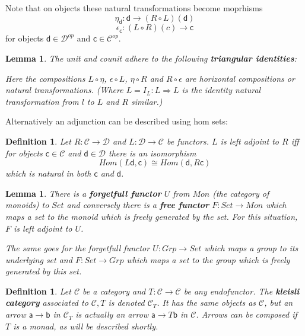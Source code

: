 \documentclass{article}
\newcommand{\cat}[1]{\mathcal{#1}} %
\newcommand{\ob}[1]{\mathsf{#1}} %
\newcommand{\catop}[1]{\cat{#1}^{op}}
\newtheorem{lemma}[theorem]{Lemma}
\newtheorem{definition}[theorem]{Definition}
\begin{document}
Note that on objects these natural transformations become moprhisms
$$\eta_\ob{d}: \ob{d} \rightarrow (R \circ L)(\ob{d})$$
$$\epsilon_\ob{c}: (L \circ R)(c) \rightarrow \ob{c}$$
for objects $\ob{d} \in \catop{D}$ and $\ob{c} \in \catop{C}$.

\begin{lemma}
	The unit and counit adhere to the following \textbf{triangular identities}:
	Here the compositions $L \circ \eta$, $\epsilon \circ L$, $\eta \circ R$ and $R \circ \epsilon$ are horizontal compositions or natural transformations.
	(Where $L = I_L: L \Rightarrow L$ is the identity natural transformation from $l$ to $L$ and $R$ similar.)
\end{lemma}

Alternatively an adjunction can be described using hom sets:

\begin{definition}
	Let $R: \cat{C} \rightarrow \cat{D}$ and $L: \cat{D} \rightarrow \cat{C}$ be functors. $L$ is left adjoint to $R$ iff for objects $\ob{c} \in \cat{C}$
	and $\ob{d} \in \cat{D}$ there is an isomorphism $$ Hom(L\ob{d}, \ob{c}) \cong Hom(\ob{d}, R\ob{c})$$
	which is natural in both $\ob{c}$ and $\ob{d}$.
\end{definition}

\begin{lemma}
	There is a \textbf{forgetfull functor} $U$ from $Mon$ (the category of monoids) to $Set$ and conversely there is a \textbf{free functor}
	$F: Set \rightarrow Mon$ which maps a set to the monoid which is freely generated by the set.
	For this situation, $F$ is left adjoint to $U$.

	The same goes for the forgetfull functor $U: Grp \rightarrow Set$ which maps a group to its underlying set and $F: Set \rightarrow Grp$ which maps a set to the group which is freely generated by this set.
\end{lemma}

\begin{definition}
	Let $\cat{C}$ be a category and $T: \cat{C} \rightarrow \cat{C}$ be any endofunctor.
	The \textbf{kleisli category} associated to $\cat{C}, T$ is denoted $\cat{C}_T$.
	It has the same objects as $\cat{C}$, but an arrow $\ob{a} \rightarrow \ob{b}$ in $\cat{C}_T$ is actually an arrow $\ob{a} \rightarrow T\ob{b}$ in $\cat{C}$.
	Arrows can be composed if $T$ is a monad, as will be described shortly.
\end{definition}
\end{document}
